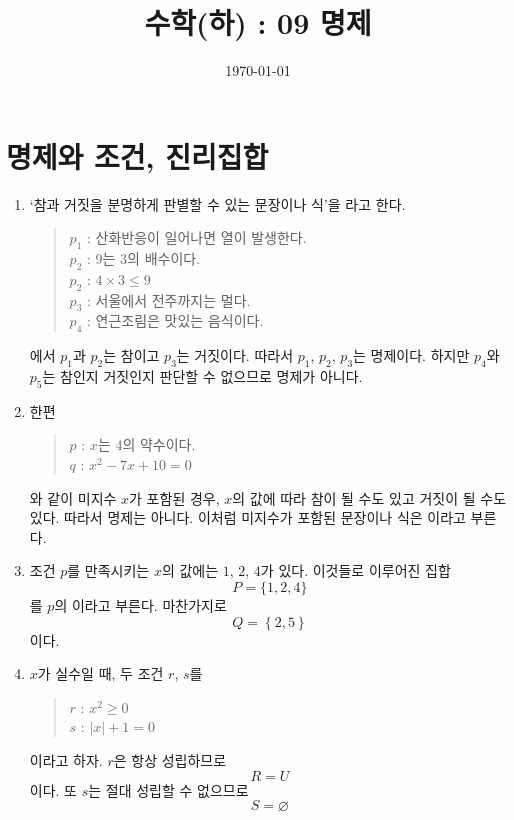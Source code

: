 \documentclass{oblivoir}
\begin{document}
\title{수학(하) : 09 명제}
\author{}
\date{\today}
\maketitle
\tableofcontents
\newpage

\section{명제와 조건, 진리집합}

%
\exam{}
\begin{enumerate}\label{proposition1}
\item
`참과 거짓을 분명하게 판별할 수 있는 문장이나 식’을 라고 한다.
\begin{quote}
\(p_1\) : 산화반응이 일어나면 열이 발생한다.\\
\(p_2\) : \(9\)는 \(3\)의 배수이다.\\
\(p_2\) : \(4\times3\le9\)\\
\(p_3\) : 서울에서 전주까지는 멀다.\\
\(p_4\) : 연근조림은 맛있는 음식이다.
\end{quote}
에서 \(p_1\)과 \(p_2\)는 참이고 \(p_3\)는 거짓이다.
따라서 \(p_1\), \(p_2\), \(p_3\)는 명제이다.
하지만 \(p_4\)와 \(p_5\)는 참인지 거짓인지 판단할 수 없으므로 명제가 아니다.
\item
한편
\begin{quote}
\(p\) : \(x\)는 \(4\)의 약수이다.\\
\(q\) : \(x^2-7x+10=0\)
\end{quote}
와 같이 미지수 \(x\)가 포함된 경우,  \(x\)의 값에 따라 참이 될 수도 있고 거짓이 될 수도 있다.\footnotemark
{}
따라서 명제는 아니다.
이처럼 미지수가 포함된 문장이나 식은 이라고 부른다.
\item
조건 \(p\)를 만족시키는 \(x\)의 값에는 \(1\), \(2\), \(4\)가 있다.
이것들로 이루어진 집합 \[P=\{1,2,4\}\]를 \(p\)의 이라고 부른다.
마찬가지로
\[Q=\left\{2,5\right\}\]
이다.
\newpage
\item
\(x\)가 실수일 때, 두 조건 \(r\), \(s\)를
\begin{quote}
\(r\) : \(x^2\ge0\)\\
\(s\) : \(|x|+1=0\)
\end{quote}
이라고 하자.
\(r\)은 항상 성립하므로
\[R=U\]
이다.
또 \(s\)는 절대 성립할 수 없으므로
\[S=\varnothing\]
\end{enumerate}
\end{document}

